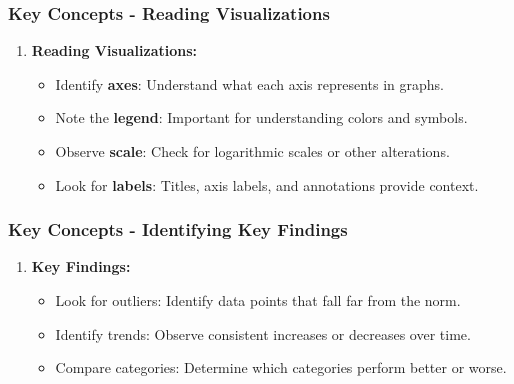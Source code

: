 \documentclass[aspectratio=169]{beamer}
\begin{document}
\begin{frame}[fragile]
    \frametitle{Key Concepts - Reading Visualizations}
    \begin{enumerate}
        \item \textbf{Reading Visualizations:}
        \begin{itemize}
            \item Identify \textbf{axes}: Understand what each axis represents in graphs.
            \item Note the \textbf{legend}: Important for understanding colors and symbols.
            \item Observe \textbf{scale}: Check for logarithmic scales or other alterations.
            \item Look for \textbf{labels}: Titles, axis labels, and annotations provide context.
        \end{itemize}
    \end{enumerate}
\end{frame}

\begin{frame}[fragile]
    \frametitle{Key Concepts - Identifying Key Findings}
    \begin{enumerate}
        \item \textbf{Key Findings:}
        \begin{itemize}
            \item Look for outliers: Identify data points that fall far from the norm.
            \item Identify trends: Observe consistent increases or decreases over time.
            \item Compare categories: Determine which categories perform better or worse.
        \end{itemize}
    \end{enumerate}
\end{frame}
\end{document}
